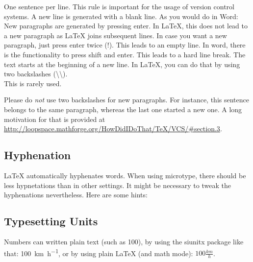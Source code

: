 \documentclass[conference,a4paper]{IEEEtran}[2015/08/26]
\begin{document}
\begin{ltgexample}
One sentence per line.
This rule is important for the usage of version control systems.
A new line is generated with a blank line.
As you would do in Word:
New paragraphs are generated by pressing enter.
In LaTeX, this does not lead to a new paragraph as LaTeX joins subsequent lines.
In case you want a new paragraph, just press enter twice (!).
This leads to an empty line.
In word, there is the functionality to press shift and enter.
This leads to a hard line break.
The text starts at the beginning of a new line.
In LaTeX, you can do that by using two backslashes (\textbackslash\textbackslash).\\
This is rarely used.

Please do \textit{not} use two backslashes for new paragraphs.
For instance, this sentence belongs to the same paragraph, whereas the last one started a new one.
A long motivation for that is provided at \url{http://loopspace.mathforge.org/HowDidIDoThat/TeX/VCS/#section.3}.
\end{ltgexample}

\subsection{Hyphenation}

\LaTeX{} automatically hyphenates words.
When using microtype, there should be less hypnetations than in other settings.
It might be necessary to tweak the hyphenations nevertheless.
Here are some hints:


\subsection{Typesetting Units}

\begin{ltgexample}
Numbers can written plain text (such as 100), by using the siunitx package like that:
\SI{100}{\km\per\hour},
or by using plain \LaTeX{} (and math mode):
$100 \frac{\mathit{km}}{h}$.
\end{ltgexample}
\end{document}
